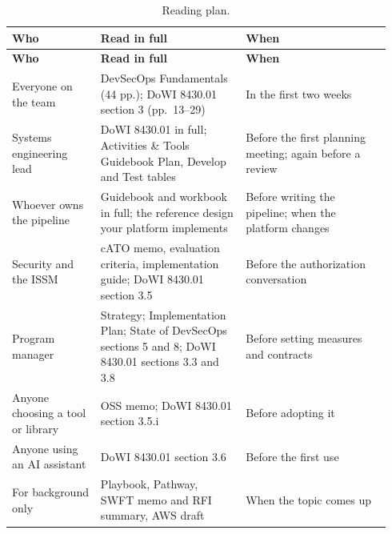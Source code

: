 \documentclass[11pt,letterpaper,twoside,openany]{memoir}
\begin{document}
\begin{longtable}{@{}L{0.22\linewidth}L{0.36\linewidth}L{0.36\linewidth}@{}}
\caption{Reading plan.}\label{tab:read}\\
\toprule \sffamily\bfseries Who & \sffamily\bfseries Read in full & \sffamily\bfseries When\\ \midrule\endfirsthead
\toprule \sffamily\bfseries Who & \sffamily\bfseries Read in full & \sffamily\bfseries When\\ \midrule\endhead
\bottomrule\endfoot
Everyone on the team & DevSecOps Fundamentals (44 pp.); DoWI 8430.01 section 3 (pp.~13--29) & In the first two weeks\\
Systems engineering lead & DoWI 8430.01 in full; Activities \& Tools Guidebook Plan, Develop and Test tables & Before the first planning meeting; again before a review\\
Whoever owns the pipeline & Guidebook and workbook in full; the reference design your platform implements & Before writing the pipeline; when the platform changes\\
Security and the ISSM & cATO memo, evaluation criteria, implementation guide; DoWI 8430.01 section 3.5 & Before the authorization conversation\\
Program manager & Strategy; Implementation Plan; State of DevSecOps sections 5 and 8; DoWI 8430.01 sections 3.3 and 3.8 & Before setting measures and contracts\\
Anyone choosing a tool or library & OSS memo; DoWI 8430.01 section 3.5.i & Before adopting it\\
Anyone using an AI assistant & DoWI 8430.01 section 3.6 & Before the first use\\
For background only & Playbook, Pathway, SWFT memo and RFI summary, AWS draft & When the topic comes up\\
\end{longtable}

\appendix
\end{document}
